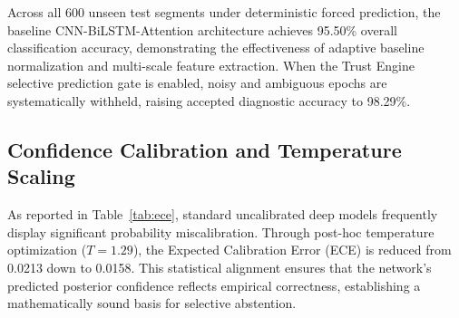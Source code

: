\documentclass[conference,a4paper]{IEEEtran}
\begin{document}
Across all 600 unseen test segments under deterministic forced prediction, the baseline CNN-BiLSTM-Attention architecture achieves 95.50\% overall classification accuracy, demonstrating the effectiveness of adaptive baseline normalization and multi-scale feature extraction. When the Trust Engine selective prediction gate is enabled, noisy and ambiguous epochs are systematically withheld, raising accepted diagnostic accuracy to 98.29\%.
\begin{table}[htbp]
\renewcommand{\arraystretch}{1.4}
\caption{Classification Performance Across Machine Learning Models}
\label{tab:perf_comp}
\begin{center}
\end{center}
\end{table}

\subsection{Confidence Calibration and Temperature Scaling}
As reported in Table~\ref{tab:ece}, standard uncalibrated deep models frequently display significant probability miscalibration. Through post-hoc temperature optimization ($T = 1.29$), the Expected Calibration Error (ECE) is reduced from 0.0213 down to 0.0158. This statistical alignment ensures that the network's predicted posterior confidence reflects empirical correctness, establishing a mathematically sound basis for selective abstention.
\begin{table}[htbp]
\renewcommand{\arraystretch}{1.4}
\caption{Calibration Metrics Pre- and Post-Temperature Scaling}
\label{tab:ece}
\begin{center}
\end{center}
\end{table}
\end{document}
